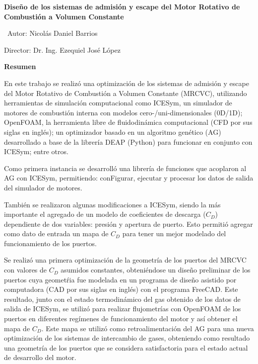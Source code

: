 \newpage
\thispagestyle{plain}

\begin{center}
\large{\textbf{{Diseño de los sistemas de admisión y escape del Motor Rotativo de Combustión a Volumen Constante}}}\\
\end{center}

\normalsize
\
 \hfill Autor: Nicolás Daniel Barrios

\hfill Director: Dr. Ing. Ezequiel José López


\textbf{Resumen}


En este trabajo se realizó una optimización de los sistemas de admisión y escape
del Motor Rotativo de Combustión a Volumen Constante (MRCVC), utilizando
herramientas de simulación computacional como ICESym, un simulador de motores de
combustión interna con modelos cero-/uni-dimensionales (0D/1D);
OpenFOAM, la herramienta libre de fluidodinámica computacional (CFD por sus
siglas en inglés); un optimizador basado en un algoritmo genético (AG)
desarrollado a base de la librería DEAP (Python) para funcionar en conjunto con
ICESym; entre otros.

Como primera instancia se desarrolló una librería de funciones que acoplaron al
AG con ICESym, permitiendo: conFigurar, ejecutar y procesar los datos de salida
del simulador de motores.
%

También se realizaron algunas modificaciones a ICESym, siendo la más importante
el agregado de un modelo de coeficientes de descarga ($C_D$) dependiente de dos
variables: presión y apertura de puerto.
%
Esto permitió agregar como dato de entrada un mapa de $C_D$ para tener un mejor
modelado del funcionamiento de los puertos.


Se realizó una primera optimización de la geometría de los puertos del MRCVC con
valores de $C_D$ asumidos constantes, obteniéndose un diseño preliminar de los
puertos cuya geometŕia fue modelada en un programa de diseño asistido por
computadora (CAD por sus siglas en inglés) con el programa FreeCAD.
%
Este resultado, junto con el estado termodinámico del gas obtenido de los datos
de salida de ICESym, se utilizó para realizar flujometrías con OpenFOAM de los
puertos en diferentes regímenes de funcionamiento del motor y así obtener el
mapa de $C_D$.
%
Este mapa se utilizó como retroalimentación del AG para una nueva optimización
de los sistemas de intercambio de gases, obteniendo como resultado una
geometría de los puertos que se considera satisfactoria para el estado actual
de desarrollo del motor.


